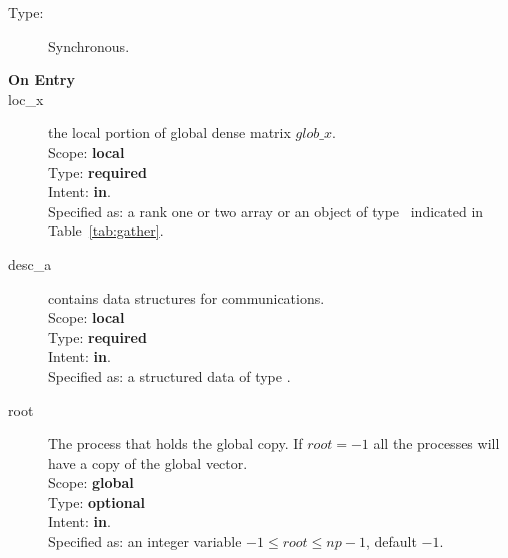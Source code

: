 \begin{description}
\item[Type:] Synchronous.
\item[\bf On Entry]
\item[loc\_x] the local portion of global dense matrix
$glob\_x$. \\
Scope: {\bf local} \\
Type: {\bf required}\\
Intent: {\bf in}.\\
Specified as:  a rank one or two array or an object of type \vdata\ 
indicated in Table~\ref{tab:gather}.
\item[desc\_a] contains data structures for communications.\\
Scope: {\bf local} \\
Type: {\bf required}\\
Intent: {\bf in}.\\
Specified as: a structured data of type \descdata.
\item[root]  The process that holds the global copy. If $root=-1$ all
  the processes will have a copy of the global vector.\\
Scope: {\bf global} \\
Type: {\bf optional}\\
Intent: {\bf in}.\\
Specified as: an integer variable $-1\le root\le np-1$, default $-1$. 

\end{description}
